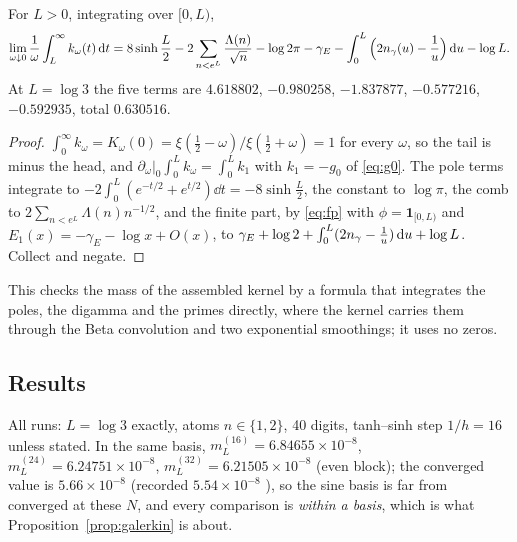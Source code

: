 \begin{proposition}\label{prop:tail}
For $L>0$, integrating over $[0,L)$,
\begin{equation}\label{eq:tail}
 \lim_{\omega\downarrow0}\frac1\omega\int_L^\infty k_\omega(t)\,\mathrm d t
 =8\sinh\frac L2-2\sum_{n<e^L}\frac{\Lambda(n)}{\sqrt n}-\log2\pi-\gamma_E
 -\int_0^L\Big(2n_{\gamma}(u)-\frac1u\Big)\,\mathrm d u-\log L .
\end{equation}
At $L=\log3$ the five terms are $4.618802$, $-0.980258$, $-1.837877$,
$-0.577216$, $-0.592935$, total $0.630516$.
\end{proposition}
\begin{proof}
$\int_0^\infty k_\omega=K_\omega(0)=\xi(\frac12-\omega)/\xi(\frac12+\omega)=1$
for every $\omega$, so the tail is minus the head, and
$\partial_\omega|_0\int_0^Lk_\omega=\int_0^Lk_1$ with $k_1=-g_0$ of
\eqref{eq:g0}. The pole terms integrate to
$-2\int_0^L(e^{-t/2}+e^{t/2})\dd t=-8\sinh\frac L2$, the constant to $\log\pi$,
the comb to $2\sum_{n<e^L}\Lambda(n)n^{-1/2}$, and the finite part, by
\eqref{eq:fp} with $\phi=\mathbf 1_{[0,L)}$ and $E_1(x)=-\gamma_E-\log x+O(x)$,
to $\gamma_E+\log2+\int_0^L(2n_{\gamma}-\frac1u)\,\mathrm d u+\log L$. Collect and negate.
\end{proof}

This checks the mass of the assembled kernel by a formula that integrates the
poles, the digamma and the primes directly, where the kernel carries them
through the Beta convolution and two exponential smoothings; it uses no zeros.

\subsection{Results}\label{sec:results}

All runs: $L=\log3$ exactly, atoms $n\in\{1,2\}$, 40 digits, tanh--sinh step
$1/h=16$ unless stated. In the same basis, $m_L^{(16)}=6.84655\times10^{-8}$,
$m_L^{(24)}=6.24751\times10^{-8}$, $m_L^{(32)}=6.21505\times10^{-8}$ (even
block); the converged value is $5.66\times10^{-8}$ \cite{FrameBound}
(recorded $5.54\times10^{-8}$ \cite{CriticalPath}), so the sine basis is far
from converged at these $N$, and every comparison is \emph{within a basis},
which is what Proposition~\ref{prop:galerkin} is about.

